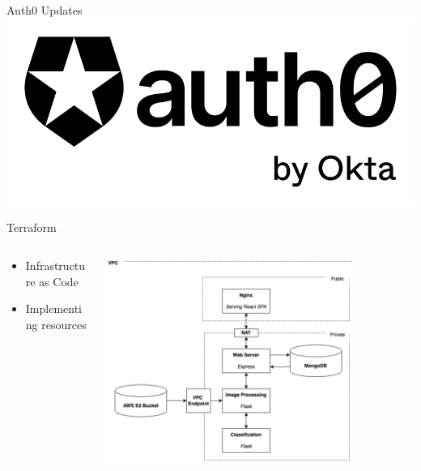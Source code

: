 
\begin{frame}{Auth0 Updates}
    \centering
    \includegraphics[height=0.6\textheight,keepaspectratio]{images/mm_auth0.png}
\end{frame}

\begin{frame}{Terraform}
    \begin{columns}
        \begin{column}{0.3\textwidth}
            \begin{itemize}
                \item Infrastructure as Code
                \item Implementing resources
            \end{itemize}
        \end{column}
        \begin{column}{0.7\textwidth}
            \centering
            \includegraphics[height=0.8\textheight,width=0.8\textwidth,keepaspectratio]{images/mm_aws.png}
        \end{column}
    \end{columns}
\end{frame}

